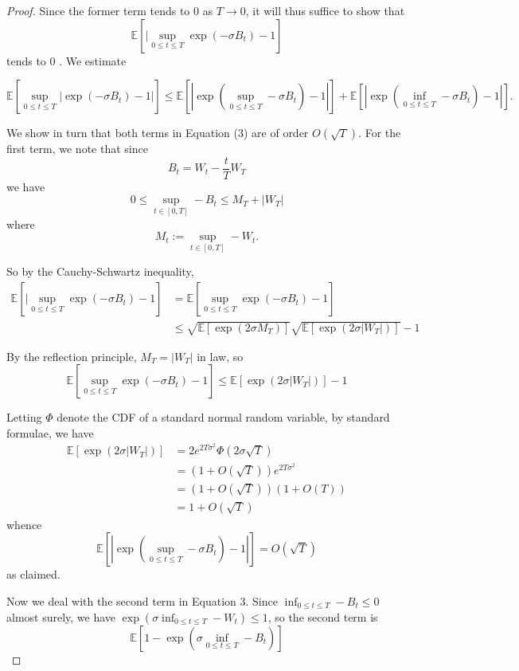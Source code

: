 \documentclass[10pt,a4paper]{amsart}
\begin{document}
\begin{proof}
Since the former term tends to 0 as $T \rightarrow 0$, it will thus suffice to show that
$$
\mathbb{E}\left[\mid \sup _{0 \leq t \leq T} \exp \left(-\sigma B_{t}\right)-1\right]
$$
tends to 0 . We estimate

\begin{equation}
\mathbb{E}\left[\sup _{0 \leq t \leq T}\left|\exp \left(-\sigma B_{t}\right)-1\right|\right] \leq \mathbb{E}\left[\left|\exp \left(\sup _{0 \leq t \leq T}-\sigma B_{t}\right)-1\right|\right]+\mathbb{E}\left[\left|\exp \left(\inf _{0 \leq t \leq T}-\sigma B_{t}\right)-1\right|\right] .
\end{equation}


We show in turn that both terms in Equation (3) are of order $O(\sqrt{T})$. For the first term, we note that since
$$
B_{t}=W_{t}-\frac{t}{T} W_{T}
$$
we have
$$
0 \leq \sup _{t \in[0, T]}-B_{t} \leq M_{T}+\left|W_{T}\right|
$$
where
$$
M_{t}:=\sup _{t \in[0, T]}-W_{t} .
$$

So by the Cauchy-Schwartz inequality,
$$
\begin{aligned}
\mathbb{E}\left[\mid \sup _{0 \leq t \leq T} \exp \left(-\sigma B_{t}\right)-1\right] & =\mathbb{E}\left[\sup _{0 \leq t \leq T} \exp \left(-\sigma B_{t}\right)-1\right] \\
& \leq \sqrt{\mathbb{E}\left[\exp \left(2 \sigma M_{T}\right)\right]} \sqrt{\mathbb{E}\left[\exp \left(2 \sigma\left|W_{T}\right|\right)\right]}-1
\end{aligned}
$$

By the reflection principle, $M_{T}=\left|W_{T}\right|$ in law, so
$$
\mathbb{E}\left[\sup _{0 \leq t \leq T} \exp \left(-\sigma B_{t}\right)-1\right] \leq \mathbb{E}\left[\exp \left(2 \sigma\left|W_{T}\right|\right)\right]-1
$$

Letting $\Phi$ denote the CDF of a standard normal random variable, by standard formulae, we have
$$
\begin{aligned}
\mathbb{E}\left[\exp \left(2 \sigma\left|W_{T}\right|\right)\right] & =2 e^{2 T \sigma^{2}} \Phi(2 \sigma \sqrt{T}) \\
& =(1+O(\sqrt{T})) e^{2 T \sigma^{2}} \\
& =(1+O(\sqrt{T}))(1+O(T)) \\
& =1+O(\sqrt{T})
\end{aligned}
$$
whence
$$
\mathbb{E}\left[\left|\exp \left(\sup _{0 \leq t \leq T}-\sigma B_{t}\right)-1\right|\right]=O(\sqrt{T})
$$
as claimed.

Now we deal with the second term in Equation 3. Since $\inf _{0 \leq t \leq T}-B_{t} \leq 0$ almost surely, we have $\exp \left(\sigma \inf _{0 \leq t \leq T}-W_{t}\right) \leq 1$, so the second term is
$$
\mathbb{E}\left[1-\exp \left(\sigma \inf _{0 \leq t \leq T}-B_{t}\right)\right]
$$


\end{proof}
\end{document}
